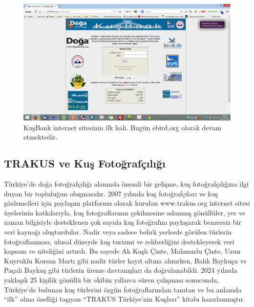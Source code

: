 \documentclass[
  a4paper,
  DIV=11,
  numbers=noendperiod]{scrreprt}
\begin{document}
\begin{figure}[H]

{\centering \includegraphics{images/kusbank.png}

}

\caption{KuşBank internet sitesinin ilk hali. Bugün ebird.org olarak
devam etmektedir.}

\end{figure}%

\subsection*{TRAKUS ve Kuş
Fotoğrafçılığı}\label{trakus-ve-kuux15f-fotoux11frafuxe7ux131lux131ux11fux131}

Türkiye'de doğa fotoğrafçılığı alanında önemli bir gelişme, kuş
fotoğrafçılığına ilgi duyan bir topluluğun oluşmasıdır. 2007 yılında kuş
fotoğrafçıları ve kuş gözlemcileri için paylaşım platformu olarak
kurulan www.trakus.org internet sitesi üyelerinin katkılarıyla, kuş
fotoğraflarının çekilmesine adanmış gönüllüler, yer ve zaman bilgisiyle
desteklenen çok sayıda kuş fotoğrafını paylaşarak benzersiz bir veri
kaynağı oluşturdular. Nadir veya sadece belirli yerlerde görülen
türlerin fotoğraflanması, ulusal düzeyde kuş turizmi ve rehberliğini
destekleyerek veri kapsam ve niteliğini artırdı. Bu sayede Ak Kaşlı
Çinte, Mahmuzlu Çinte, Uzun Kuyruklu Korsan Martı gibi nadir türler
kayıt altına alınırken, Balık Baykuşu ve Paçalı Baykuş gibi türlerin
üreme davranışları da doğrulanabildi. 2024 yılında yaklaşık 25 kişilik
gönüllü bir ekibin yıllarca süren çalışması sonucunda, Türkiye'de
bulunan kuş türlerini özgün fotoğraflarından tanıtan ve bu anlamda
``ilk'' olma özelliği taşıyan ``TRAKUS Türkiye'nin Kuşları'' kitabı
hazırlanmıştır.
\end{document}
